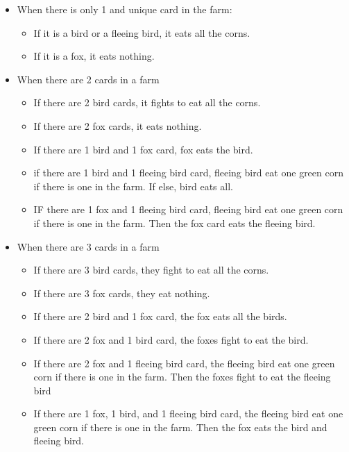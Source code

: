 \documentclass[conference]{IEEEtran}
\begin{document}
\begin{itemize}
    \item When there is only 1 and unique card in the farm:
        \begin{itemize}
            \item If it is a bird or a fleeing bird, it eats all the corns.
            \item If it is a fox, it eats nothing.
        \end{itemize}
    \item When there are 2 cards in a farm
        \begin{itemize}
            \item If there are 2 bird cards, it fights to eat all the corns.
            \item If there are 2 fox cards, it eats nothing.
            \item If there are 1 bird and 1 fox card, fox eats the bird.
            \item if there are 1 bird and 1 fleeing bird card, fleeing bird eat one green corn if there is one in the farm. If else, bird eats all.
            \item IF there are 1 fox and 1 fleeing bird card, fleeing bird eat one green corn if there is one in the farm. Then the fox card eats the fleeing bird. 
        \end{itemize}
    \item When there are 3 cards in a farm
        \begin{itemize}
            \item If there are 3 bird cards, they fight to eat all the corns.
            \item If there are 3 fox cards, they eat nothing.
            \item If there are 2 bird and 1 fox card, the fox eats all the birds.
            \item If there are 2 fox and 1 bird card, the foxes fight to eat the bird.
            \item If there are 2 fox and 1 fleeing bird card, the fleeing bird eat one green corn if there is one in the farm. Then the foxes fight to eat the fleeing bird
            \item If there are 1 fox, 1 bird, and 1 fleeing bird card, the fleeing bird eat one green corn if there is one in the farm. Then the fox eats the bird and fleeing bird.
        \end{itemize}
\end{itemize}
\end{document}
